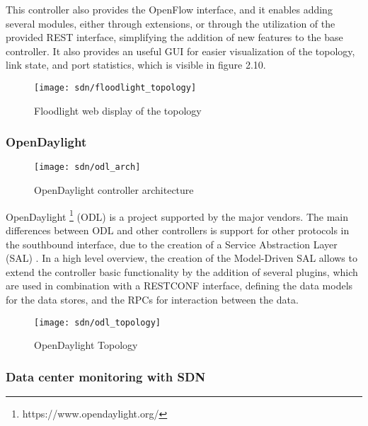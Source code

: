 \begin {enumerate}
\begin{enumerate}
\par This controller also provides the OpenFlow interface, and it enables adding several modules, either through extensions, or through the utilization of the
provided REST interface, simplifying the addition of new features to the base controller. It also provides an useful GUI for easier visualization of the topology,
link state, and port statistics, which is visible in figure 2.10.
 
\begin{figure}[H]
  \centering
  \texttt{[image: sdn/floodlight\_topology]}
  \label{fig:floodlight_gui}
  \caption{Floodlight web display of the topology}
\end{figure}

\subsubsection {OpenDaylight} \label{chap:odl}

\begin{figure}[H]
  \centering
  \texttt{[image: sdn/odl\_arch]}
  \label{fig:odl_arch}
  \caption{OpenDaylight controller architecture \cite{medved_opendaylight:_2014}}
\end{figure}

OpenDaylight \footnote{https://www.opendaylight.org/} (ODL) is a project supported by the major vendors. The main differences between ODL and other controllers
is support for other protocols in the southbound interface, due to the creation of a Service Abstraction Layer (SAL) \cite{medved_opendaylight:_2014}. In a high 
level overview, the creation of the Model-Driven SAL allows to extend the controller basic functionality by the addition of several plugins, which are used in
combination with a RESTCONF \cite{bierman_restconf_2017} interface, defining the data models for the data stores, and the RPCs for interaction between the data.

\begin{figure}[H]
  \centering
  \texttt{[image: sdn/odl\_topology]}
  \label{fig:odl_topo}
  \caption {OpenDaylight Topology}
\end{figure}

\subsubsection {Data center monitoring with SDN}


\end{enumerate}
\end{enumerate}
